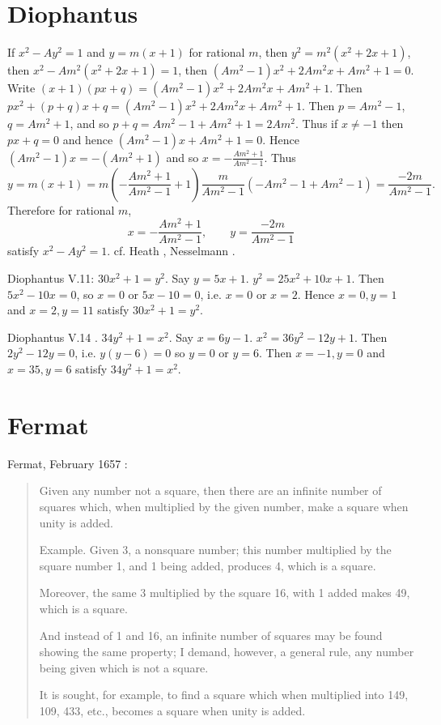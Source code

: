 \documentclass{article}
\theoremstyle{definition}
\theoremstyle{definition}
\begin{document}
\section{Diophantus}
If 
$x^2-Ay^2=1$ and 
$y=m(x+1)$ for rational $m$, then
$y^2=m^2(x^2+2x+1)$, then
$x^2-Am^2(x^2+2x+1)=1$, then
$(Am^2-1)x^2+2Am^2x+Am^2+1=0$.
 Write $(x+1)(px+q)=(Am^2-1)x^2+2Am^2x+Am^2+1$. Then
 $px^2+(p+q)x+q = (Am^2-1)x^2+2Am^2x+Am^2+1$.
 Then $p=Am^2-1$, $q=Am^2+1$,
 and so $p+q=Am^2-1+Am^2+1=2Am^2$. 
 Thus if $x \neq -1$ then $px+q=0$ and hence
 $(Am^2-1)x+Am^2+1=0$. Hence
 $(Am^2-1)x = -(Am^2+1)$ and so
 $x= - \frac{Am^2+1}{Am^2-1}$. Thus
 \[
 y=m(x+1) = m\left(- \frac{Am^2+1}{Am^2-1}+1\right)
 \frac{m}{Am^2-1}(-Am^2-1+Am^2-1)
 =\frac{-2m}{Am^2-1}.
\]
Therefore for rational $m$, 
\[
x=- \frac{Am^2+1}{Am^2-1},\qquad y = \frac{-2m}{Am^2-1}
\]
satisfy $x^2-Ay^2=1$.
cf. Heath \cite[pp.~68--69]{diophantus},
Nesselmann \cite[p.~331]{nesselmann}.

Diophantus V.11: $30x^2+1=y^2$.
Say $y=5x+1$. $y^2=25x^2+10x+1$. Then
$5x^2-10x=0$, so $x=0$ or $5x-10=0$, i.e. $x=0$ or $x=2$.
Hence $x=0,y=1$ and $x=2,y=11$ satisfy $30x^2+1=y^2$.

Diophantus V.14 \cite[pp.~211--212]{diophantus}.
$34y^2+1=x^2$.
Say $x=6y-1$. $x^2=36y^2-12y+1$. Then
$2y^2-12y=0$, i.e. $y(y-6)=0$ so $y=0$ or $y=6$. Then
$x=-1, y=0$ and $x=35, y=6$ satisfy $34y^2+1=x^2$.





\section{Fermat}
Fermat, February 1657 \cite[p.~29]{struik}:

\begin{quote}
Given any number not a square, then there are an infinite number of squares
which, when multiplied by the given number, make a square when unity is
added.

Example. Given 3, a nonsquare number; this number multiplied by the
square number 1, and 1 being added, produces 4, which is a square.

Moreover, the same 3 multiplied by the square 16, with 1 added makes 49,
which is a square.

And instead of 1 and 16, an infinite number of squares may be found showing
the same property; I demand, however, a general rule, any number being given
which is not a square.

It is sought, for example, to find a square which when multiplied into 149,
109, 433, etc., becomes a square when unity is added.
\end{quote}
\end{document}
